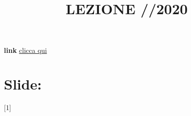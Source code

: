 \title{LEZIONE //2020}\newline
\textbf{link} \href{}{clicca qui}
\section{Slide: }
[1]
\newline[2]
\newline[3]
\newline[4]
\newline[5]
\newline[6]
\newline[7]
\newline[8]
\newline[9]
\newline[10]
\newline[11]
\newline[12]
\newline[13]
\newline[14]
\newline[15]
\newline[16]
\newline[17]
\newline[18]
\newline[19]
\newline[20]
\newline[21]
\newline[22]
\newline[23]
\newline[24]
\newline[25]
\newline[26]
\newline[27]
\newline[28]
\newline[29]
\newline[30]
\newline[31]
\newline[32]
\newline[33]